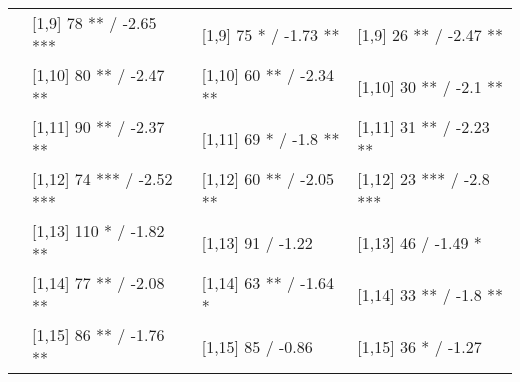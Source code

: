 \begin{table}
\begin{tabular}[t]{llll}
 & {}[1,9] 78 ** / -2.65 *** & {}[1,9] 75 * / -1.73 ** & {}[1,9] 26 ** / -2.47 **\\
 & {}[1,10] 80 ** / -2.47 ** & {}[1,10] 60 ** / -2.34 ** & {}[1,10] 30 ** / -2.1 **\\
 & {}[1,11] 90 ** / -2.37 ** & {}[1,11] 69 * / -1.8 ** & {}[1,11] 31 ** / -2.23 **\\
 & {}[1,12] 74 *** / -2.52 *** & {}[1,12] 60 ** / -2.05 ** & {}[1,12] 23 *** / -2.8 ***\\
\addlinespace
 & {}[1,13] 110 * / -1.82 ** & {}[1,13] 91  / -1.22 & {}[1,13] 46  / -1.49 *\\
 & {}[1,14] 77 ** / -2.08 ** & {}[1,14] 63 ** / -1.64 * & {}[1,14] 33 ** / -1.8 **\\
 & {}[1,15] 86 ** / -1.76 ** & {}[1,15] 85  / -0.86 & {}[1,15] 36 * / -1.27\\
\bottomrule
\end{tabular}
\end{table}
